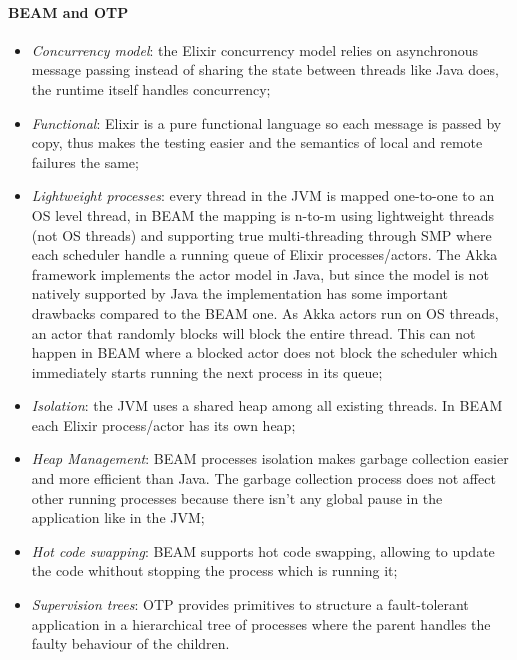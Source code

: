 \paragraph{BEAM and OTP}
\begin{itemize}
    \item \textit{Concurrency model}: the Elixir concurrency model relies on 
asynchronous message passing instead of sharing the state between threads 
like Java does, the runtime itself handles concurrency; 
   \item \textit{Functional}: Elixir is a pure functional language 
so each message is passed by copy, thus makes the testing easier and the 
semantics of local and remote failures the same; 
    \item \textit{Lightweight processes}: every thread in the JVM is mapped 
one-to-one to an OS level thread, in BEAM the mapping is n-to-m using 
lightweight threads (not OS threads) and supporting true multi-threading 
through SMP where each scheduler handle a running queue of Elixir 
processes/actors. The Akka framework implements the actor model in Java, but 
since the model is not natively supported by Java the implementation 
has some important drawbacks compared to the BEAM one. As Akka actors run on 
OS threads, an actor that randomly blocks will block the entire thread. This can
 not happen in BEAM where a blocked actor does not block the scheduler which 
immediately starts running the next process in its queue;  
    \item \textit{Isolation}: the JVM uses a shared heap among all existing 
threads. In BEAM each Elixir process/actor has its own heap;
    \item \textit{Heap Management}: BEAM processes isolation makes garbage 
collection easier and more efficient than Java. The garbage collection process 
does not affect other running processes because there isn't any global pause 
in the application like in the JVM;
    \item \textit{Hot code swapping}: BEAM supports hot code swapping, allowing 
to update the code whithout stopping the process which is running it;
    \item \textit{Supervision trees}: OTP provides primitives to structure a 
fault-tolerant application in a hierarchical tree of processes where the parent 
handles the faulty behaviour of the children.
\end{itemize}
